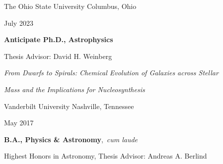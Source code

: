 \documentclass[cv.tex]{subfiles}
\begin{document}
{\color{themecolor}\large The Ohio State University}
\hfill
Columbus, Ohio
\par\noindent
\parbox{0.18\textwidth}{%
	\raggedleft
	July 2023 \par
	\null \par
	\null \par
	\null
}
\hspace{1mm}
\parbox{0.8\textwidth}{%
	\textbf{Anticipate Ph.D., Astrophysics} \par
	Thesis Advisor: David H. Weinberg \par
	\textit{From Dwarfs to Spirals: Chemical Evolution of Galaxies across
	Stellar} \par
	\textit{Mass and the Implications for Nucleosynthesis} \par
}
\vspace{2mm}
\par\noindent
{\color{themecolor}\large Vanderbilt University}
\hfill
Nashville, Tennessee
\par\noindent
\parbox{0.18\textwidth}{%
	\raggedleft
	May 2017 \par
	\null
}
\hspace{1mm}
\parbox{0.8\textwidth}{%
	\vspace{1mm}
	\textbf{B.A., Physics \& Astronomy},~\textit{cum laude} \par
	Highest Honors in Astronomy, Thesis Advisor: Andreas A. Berlind
}
\end{document}

